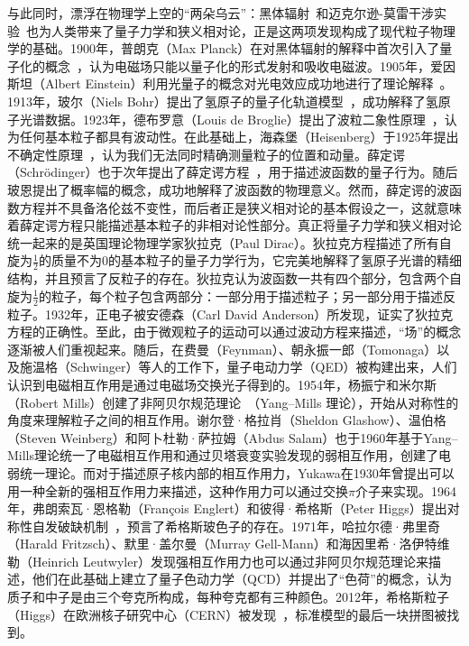 与此同时，漂浮在物理学上空的“两朵乌云”：黑体辐射~\cite{blackbody}和迈克尔逊-莫雷干涉实验~\cite{shankland1964michelson}也为人类带来了量子力学和狭义相对论，正是这两项发现构成了现代粒子物理学的基础。1900年，普朗克（Max Planck）在对黑体辐射的解释中首次引入了量子化的概念~\cite{Gearhart2009}，认为电磁场只能以量子化的形式发射和吸收电磁波。1905年，爱因斯坦（Albert Einstein）利用光量子的概念对光电效应成功地进行了理论解释~\cite{einstein1905heuristic}。1913年，玻尔（Niels Bohr）提出了氢原子的量子化轨道模型~\cite{bohr1913constitution}，成功解释了氢原子光谱数据。1923年，德布罗意（Louis de Broglie）提出了波粒二象性原理~\cite{waveparticle,menzel1960fundamental,greene2000elegant}，认为任何基本粒子都具有波动性。在此基础上，海森堡（Heisenberg）于1925年提出不确定性原理~\cite{uncer1,uncer2,uncer3}，认为我们无法同时精确测量粒子的位置和动量。薛定谔（Schrödinger）也于次年提出了薛定谔方程~\cite{schrodinger1,schrodinger2}，用于描述波函数的量子行为。随后玻恩提出了概率幅的概念，成功地解释了波函数的物理意义。然而，薛定谔的波函数方程并不具备洛伦兹不变性，而后者正是狭义相对论的基本假设之一，这就意味着薛定谔方程只能描述基本粒子的非相对论性部分。真正将量子力学和狭义相对论统一起来的是英国理论物理学家狄拉克（Paul Dirac）。狄拉克方程描述了所有自旋为$\frac{1}{2}$的质量不为0的基本粒子的量子力学行为，它完美地解释了氢原子光谱的精细结构，并且预言了反粒子的存在。狄拉克认为波函数一共有四个部分，包含两个自旋为$\frac{1}{2}$的粒子，每个粒子包含两部分：一部分用于描述粒子；另一部分用于描述反粒子。1932年，正电子被安德森（Carl David Anderson）所发现，证实了狄拉克方程的正确性。至此，由于微观粒子的运动可以通过波动方程来描述，“场”的概念逐渐被人们重视起来。随后，在费曼（Feynman）、朝永振一郎（Tomonaga）以及施温格（Schwinger）等人的工作下，量子电动力学（QED）被构建出来，人们认识到电磁相互作用是通过电磁场交换光子得到的。1954年，杨振宁和米尔斯（Robert Mills）创建了非阿贝尔规范理论~\cite{PhysRev.96.191}（Yang–Mills 理论），开始从对称性的角度来理解粒子之间的相互作用。谢尔登·格拉肖（Sheldon Glashow）、温伯格（Steven Weinberg）和阿卜杜勒·萨拉姆（Abdus Salam）也于1960年基于Yang–Mills理论统一了电磁相互作用和通过贝塔衰变实验发现的弱相互作用，创建了电弱统一理论。而对于描述原子核内部的相互作用力，Yukawa在1930年曾提出可以用一种全新的强相互作用力来描述，这种作用力可以通过交换$\pi$介子来实现。1964年，弗朗索瓦·恩格勒（François Englert）和彼得·希格斯（Peter Higgs）提出对称性自发破缺机制~\cite{PhysRevLett.13.321, brout1998spontaneous, PhysRevLett.13.508}，预言了希格斯玻色子的存在。1971年，哈拉尔德·弗里奇（Harald Fritzsch）、默里·盖尔曼（Murray Gell-Mann）和海因里希·洛伊特维勒（Heinrich Leutwyler）发现强相互作用力也可以通过非阿贝尔规范理论来描述，他们在此基础上建立了量子色动力学（QCD）并提出了“色荷”的概念，认为质子和中子是由三个夸克所构成，每种夸克都有三种颜色。2012年，希格斯粒子（Higgs）在欧洲核子研究中心（CERN）被发现~\cite{HiggsdiscoveryAtlas, Chatrchyan:2012ufa, Chatrchyan:2013lba}，标准模型的最后一块拼图被找到。

